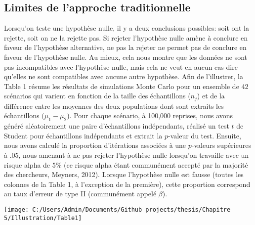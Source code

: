 \documentclass[
  12pt,
  french,
]{article}
\begin{document}
\hypertarget{limites-de-lapproche-traditionnelle}{%
\subsection{Limites de l'approche
traditionnelle}\label{limites-de-lapproche-traditionnelle}}

Lorsqu'on teste une hypothèse nulle, il y a deux conclusions possibles:
soit ont la rejette, soit on ne la rejette pas. Si rejeter l'hypothèse
nulle amène à conclure en faveur de l'hypothèse alternative, ne pas la
rejeter ne permet pas de conclure en faveur de l'hypothèse nulle. Au
mieux, cela nous montre que les données ne sont pas incompatibles avec
l'hypothèse nulle, mais cela ne veut en aucun cas dire qu'elles ne sont
compatibles avec aucune autre hypothèse. Afin de l'illustrer, la Table 1
résume les résultats de simulations Monte Carlo pour un ensemble de 42
scénarios qui varient en fonction de la taille des échantillons
(\(n_j\)) et de la différence entre les moyennes des deux populations
dont sont extraits les échantillons (\(\mu_1-\mu_2\)). Pour chaque
scénario, à 100,000 reprises, nous avons généré aléatoirement une paire
d'échantillons indépendants, réalisé un test \(t\) de Student pour
échantillons indépendants et extrait la \(p\)-valeur du test. Ensuite,
nous avons calculé la proportion d'itérations associées à une
\(p\)-valeurs supérieures à .05, nous amenant à ne pas rejeter
l'hypothèse nulle lorsqu'on travaille avec un risque alpha de 5\% (ce
risque alpha étant communément accepté par la majorité des chercheurs,
Meyners, 2012). Lorsque l'hypothèse nulle est fausse (toutes les
colonnes de la Table 1, à l'exception de la première), cette proportion
correspond au taux d'erreur de type II (communément appelé \(\beta\)).

\begin{flushleft}\texttt{[image: C:/Users/Admin/Documents/Github projects/thesis/Chapitre 5/Illustration/Table1]} \end{flushleft}
\newpage
\end{document}
